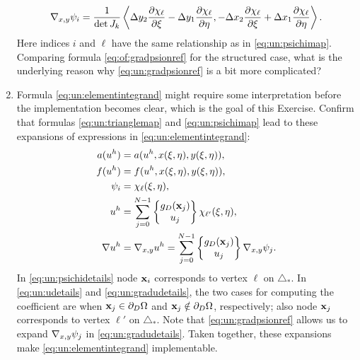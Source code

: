 \begin{enumerate}
\begin{equation}
\nabla_{x,y} \psi_i = \frac{1}{\det J_k} \left<\Delta y_2 \frac{\partial \chi_\ell}{\partial \xi} - \Delta y_1 \frac{\partial \chi_\ell}{\partial \eta}, - \Delta x_2 \frac{\partial \chi_\ell}{\partial \xi} + \Delta x_1 \frac{\partial \chi_\ell}{\partial \eta}\right>. \label{eq:un:gradpsionref}
\end{equation}
Here indices $i$ and $\ell$ have the same relationship as in \eqref{eq:un:psichimap}.  Comparing formula \eqref{eq:of:gradpsionref} for the structured case, what is the underlying reason why \eqref{eq:un:gradpsionref} is a bit more complicated?  %
\item  \label{exer:un:elementintegranddetails}  Formula \eqref{eq:un:elementintegrand} might require some interpretation before the implementation becomes clear, which is the goal of this Exercise.  Confirm that formulas \eqref{eq:un:trianglemap} and \eqref{eq:un:psichimap} lead to these expansions of expressions in \eqref{eq:un:elementintegrand}:
\begin{align}
a(u^h) &= a(u^h,x(\xi,\eta),y(\xi,\eta)), \label{eq:un:adetails} \\
f(u^h) &= f(u^h,x(\xi,\eta),y(\xi,\eta)), \label{eq:un:fdetails} \\
\psi_i &= \chi_{\ell}(\xi,\eta), \label{eq:un:psichidetails} \\
u^h &= \sum_{j=0}^{N-1} \left\{\begin{matrix} g_D(\mathbf{x}_j) \\ u_j \end{matrix}\right\} \chi_{\ell'}(\xi,\eta), \label{eq:un:udetails} \\
\nabla u^h &= \nabla_{x,y} u^h = \sum_{j=0}^{N-1} \left\{\begin{matrix} g_D(\mathbf{x}_j) \\ u_j \end{matrix}\right\} \nabla_{x,y} \psi_j. \label{eq:un:gradudetails}
\end{align}
In \eqref{eq:un:psichidetails} node $\mathbf{x}_i$ corresponds to vertex $\ell$ on $\triangle_\ast$.  In \eqref{eq:un:udetails} and \eqref{eq:un:gradudetails}, the two cases for computing the coefficient are when $\mathbf{x}_j \in \partial_D \Omega$ and $\mathbf{x}_j \notin \partial_D \Omega$, respectively; also node $\mathbf{x}_j$ corresponds to vertex $\ell'$ on $\triangle_\ast$.  Note that \eqref{eq:un:gradpsionref} allows us to expand $\nabla_{x,y} \psi_j$ in \eqref{eq:un:gradudetails}.  Taken together, these expansions make \eqref{eq:un:elementintegrand} implementable.

\end{enumerate}
